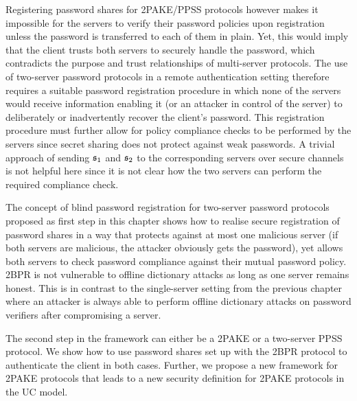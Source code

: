 Registering password shares for \ac{2PAKE}/\ac{PPSS} protocols however makes it impossible for the servers to verify their password policies upon registration unless the password is transferred to each of them in plain. 
Yet, this would imply that the client trusts both servers to securely handle the password, which contradicts the purpose and trust relationships of multi-server protocols.
The use of two-server password protocols in a remote authentication setting therefore requires a suitable password registration procedure in which none of the servers would receive information enabling it (or an attacker in control of the server) to deliberately or inadvertently recover the client's password.
This registration procedure must further allow for policy compliance checks to be performed by the servers since secret sharing does not protect against weak passwords.
A trivial approach of sending $\mathfrak{s}_1$ and $\mathfrak{s}_2$ to the corresponding servers over secure channels is not helpful here since it is not clear how the two servers can perform the required compliance check.

The concept of blind password registration for two-server password protocols proposed as first step in this chapter shows how to realise secure registration of password shares in a way that protects against at most one malicious server (if both servers are malicious, the attacker obviously gets the password), yet allows both servers to check password compliance against their mutual password policy.
\ac{2BPR} is not vulnerable to offline dictionary attacks as long as one server remains honest.
This is in contrast to the single-server setting from the previous chapter where an attacker is always able to perform offline dictionary attacks on password verifiers after compromising a server. 

The second step in the framework can either be a \ac{2PAKE} or a two-server \ac{PPSS} protocol.
We show how to use password shares set up with the \ac{2BPR} protocol to authenticate the client in both cases.
Further, we propose a new framework for \ac{2PAKE} protocols that leads to a new security definition for \ac{2PAKE} protocols in the \ac{UC} model.


